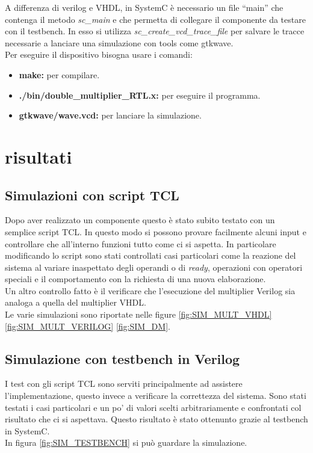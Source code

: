\documentclass[]{IEEEtran}
\begin{document}
A differenza di verilog e VHDL, in SystemC è necessario un file ``main'' che contenga il metodo \textit{sc\_main} e che permetta di collegare il componente da testare con il testbench. In esso si utilizza \textit{sc\_create\_vcd\_trace\_file} per salvare le tracce necessarie a lanciare una simulazione con tools come gtkwave.
\\Per eseguire il dispositivo bisogna usare i comandi:
\begin{itemize}
    \item \textbf{make: } per compilare.
    \item \textbf{./bin/double\_multiplier\_RTL.x:} per eseguire il programma.
    \item \textbf{gtkwave/wave.vcd:} per lanciare la simulazione.
\end{itemize}



\section{risultati}

\subsection{Simulazioni con script TCL}
Dopo aver realizzato un componente questo è stato subito testato con un semplice script TCL. In questo modo si possono provare facilmente alcuni input e controllare che all'interno funzioni tutto come ci si aspetta. In particolare modificando lo script sono stati controllati casi particolari come la reazione del sistema al variare inaspettato degli operandi o di \textit{ready}, operazioni con operatori speciali e il comportamento con la richiesta di una nuova elaborazione.
\\Un altro controllo fatto è il verificare che l'esecuzione del multiplier Verilog sia analoga a quella del multiplier VHDL.
\\Le varie simulazioni sono riportate nelle figure \ref{fig:SIM_MULT_VHDL} \ref{fig:SIM_MULT_VERILOG} \ref{fig:SIM_DM}.

\subsection{Simulazione con testbench in Verilog}
I test con gli script TCL sono serviti principalmente ad assistere l'implementazione, questo invece a verificare la correttezza del sistema. Sono stati testati i casi particolari e un po' di valori scelti arbitrariamente e confrontati col risultato che ci si aspettava. Questo risultato è stato ottenunto grazie al testbench in SystemC.
\\In figura \ref{fig:SIM_TESTBENCH} si può guardare la simulazione.
\end{document}
